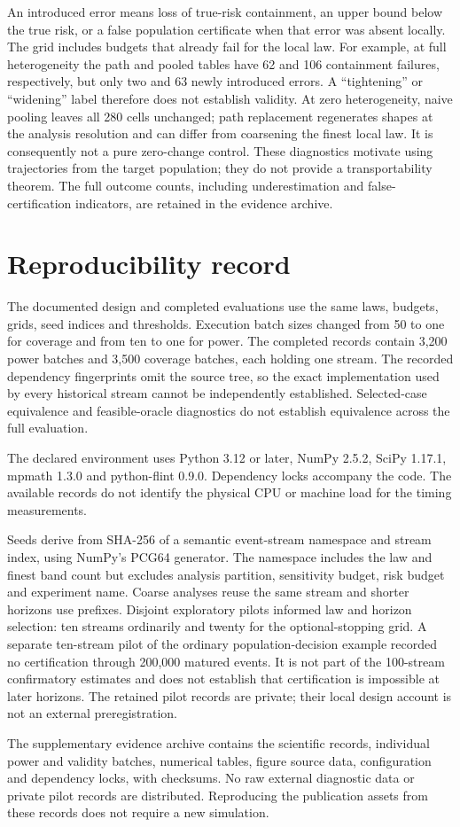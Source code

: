 \documentclass[10pt]{article}
\begin{document}
An introduced error means loss of true-risk containment, an upper bound below the true risk, or a false population certificate when that error was absent locally. The grid includes budgets that already fail for the local law. For example, at full heterogeneity the path and pooled tables have 62 and 106 containment failures, respectively, but only two and 63 newly introduced errors. A ``tightening'' or ``widening'' label therefore does not establish validity. At zero heterogeneity, naive pooling leaves all 280 cells unchanged; path replacement regenerates shapes at the analysis resolution and can differ from coarsening the finest local law. It is consequently not a pure zero-change control. These diagnostics motivate using trajectories from the target population; they do not provide a transportability theorem. The full outcome counts, including underestimation and false-certification indicators, are retained in the evidence archive.

\section{Reproducibility record}
The documented design and completed evaluations use the same laws, budgets, grids, seed indices and thresholds. Execution batch sizes changed from 50 to one for coverage and from ten to one for power. The completed records contain 3,200 power batches and 3,500 coverage batches, each holding one stream. The recorded dependency fingerprints omit the source tree, so the exact implementation used by every historical stream cannot be independently established. Selected-case equivalence and feasible-oracle diagnostics do not establish equivalence across the full evaluation.

The declared environment uses Python 3.12 or later, NumPy 2.5.2, SciPy 1.17.1, mpmath 1.3.0 and python-flint 0.9.0. Dependency locks accompany the code. The available records do not identify the physical CPU or machine load for the timing measurements.

Seeds derive from SHA-256 of a semantic event-stream namespace and stream index, using NumPy's PCG64 generator. The namespace includes the law and finest band count but excludes analysis partition, sensitivity budget, risk budget and experiment name. Coarse analyses reuse the same stream and shorter horizons use prefixes. Disjoint exploratory pilots informed law and horizon selection: ten streams ordinarily and twenty for the optional-stopping grid. A separate ten-stream pilot of the ordinary population-decision example recorded no certification through 200,000 matured events. It is not part of the 100-stream confirmatory estimates and does not establish that certification is impossible at later horizons. The retained pilot records are private; their local design account is not an external preregistration.

The supplementary evidence archive contains the scientific records, individual power and validity batches, numerical tables, figure source data, configuration and dependency locks, with checksums. No raw external diagnostic data or private pilot records are distributed. Reproducing the publication assets from these records does not require a new simulation.
\end{document}

